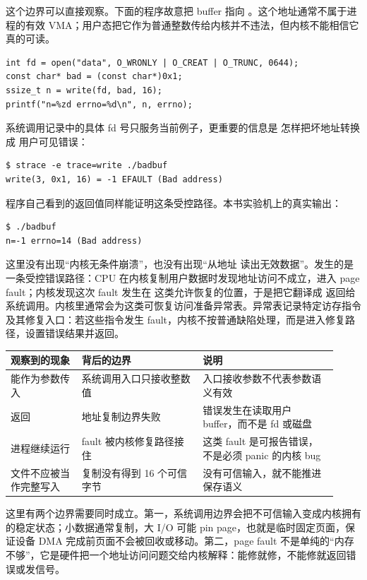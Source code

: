 这个边界可以直接观察。下面的程序故意把 buffer 指向 。这个地址通常不属于进程的有效 VMA；用户态把它作为普通整数传给内核并不违法，但内核不能相信它真的可读。

\begin{lstlisting}
int fd = open("data", O_WRONLY | O_CREAT | O_TRUNC, 0644);
const char* bad = (const char*)0x1;
ssize_t n = write(fd, bad, 16);
printf("n=%zd errno=%d\n", n, errno);
\end{lstlisting}

系统调用记录中的具体 fd 号只服务当前例子，更重要的信息是  怎样把坏地址转换成
用户可见错误：

\begin{lstlisting}
$ strace -e trace=write ./badbuf
write(3, 0x1, 16) = -1 EFAULT (Bad address)
\end{lstlisting}

程序自己看到的返回值同样能证明这条受控路径。本书实验机上的真实输出：

\begin{lstlisting}
$ ./badbuf
n=-1 errno=14 (Bad address)
\end{lstlisting}

这里没有出现“内核无条件崩溃”，也没有出现“从地址  读出无效数据”。发生的是一条受控错误路径：CPU 在内核复制用户数据时发现地址访问不成立，进入 page fault；内核发现这次 fault 发生在  这类允许恢复的位置，于是把它翻译成  返回给系统调用。内核里通常会为这类可恢复访问准备异常表。异常表记录特定访存指令及其修复入口：若这些指令发生 fault，内核不按普通缺陷处理，而是进入修复路径，设置错误结果并返回。

\begin{longtable}{|L{0.2\linewidth}|L{0.34\linewidth}|L{0.38\linewidth}|}
\toprule
观察到的现象 & 背后的边界 & 说明 \\
\midrule
{} 能作为参数传入 & 系统调用入口只接收整数值 & 入口接收参数不代表参数语义有效 \\\tablerowrule
{} 返回  & 地址复制边界失败 & 错误发生在读取用户 buffer，而不是 fd 或磁盘 \\\tablerowrule
进程继续运行 & fault 被内核修复路径接住 & 这类 fault 是可报告错误，不是必须 panic 的内核 bug \\\tablerowrule
文件不应被当作完整写入 & 复制没有得到 16 个可信字节 & 没有可信输入，就不能推进保存语义 \\
\bottomrule
\end{longtable}

这里有两个边界需要同时成立。第一，系统调用边界会把不可信输入变成内核拥有的稳定状态；小数据通常复制，大 I/O 可能 pin page，也就是临时固定页面，保证设备 DMA 完成前页面不会被回收或移动。第二，page fault 不是单纯的“内存不够”，它是硬件把一个地址访问问题交给内核解释：能修就修，不能修就返回错误或发信号。

